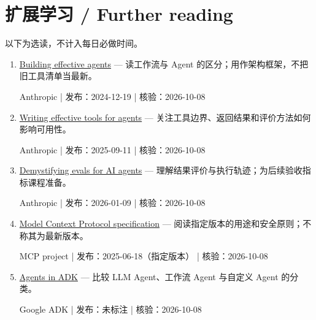 \documentclass[11pt]{article}
\newcommand{\Needspace}[1]{\par\ifdim\dimexpr\pagegoal-\pagetotal\relax<#1\relax\newpage\fi}
\begin{document}
\Needspace{6\baselineskip}\section*{扩展学习 / Further reading}\small 以下为选读，不计入每日必做时间。\begin{enumerate}[leftmargin=1.6em]

\item [S1] \href{https://www.anthropic.com/engineering/building-effective-agents}{Building effective agents} — 读工作流与 Agent 的区分；用作架构框架，不把旧工具清单当最新。\par Anthropic | 发布：2024-12-19 | 核验：2026-10-08

\item [S2] \href{https://www.anthropic.com/engineering/writing-tools-for-agents}{Writing effective tools for agents} — 关注工具边界、返回结果和评价方法如何影响可用性。\par Anthropic | 发布：2025-09-11 | 核验：2026-10-08

\item [S3] \href{https://www.anthropic.com/engineering/demystifying-evals-for-ai-agents}{Demystifying evals for AI agents} — 理解结果评价与执行轨迹；为后续验收指标课程准备。\par Anthropic | 发布：2026-01-09 | 核验：2026-10-08

\item [S4] \href{https://modelcontextprotocol.io/specification/2025-06-18}{Model Context Protocol specification} — 阅读指定版本的用途和安全原则；不称其为最新版本。\par MCP project | 发布：2025-06-18（指定版本） | 核验：2026-10-08

\item [S5] \href{https://adk.dev/agents/}{Agents in ADK} — 比较 LLM Agent、工作流 Agent 与自定义 Agent 的分类。\par Google ADK | 发布：未标注 | 核验：2026-10-08

\end{enumerate}
\end{document}
